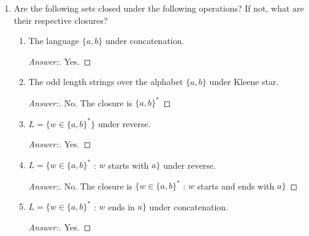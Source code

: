 \documentclass[10pt]{article}
\begin{document}
\begin{enumerate}
\begin{enumerate}
\item
$L = \{w \in \{a, b\}^*$ : $\exists x \in \{a, b\}^+ (w = axa)\}$.
\begin{proof}[Answer:]
\end{proof}
\end{enumerate}


\item
Are the following sets closed under the following operations?  If not, what are their respective closures?
\begin{enumerate}

\item
The language $\{a, b\}$ under concatenation.
\begin{proof}[Answer:]
Yes.
\end{proof}

\item
The odd length strings over the alphabet $\{a, b\}$ under Kleene star.
\begin{proof}[Answer:]
No.  The closure is $\{a, b\}^*$
\end{proof}

\item
$L = \{w \in \{a, b\}^*\}$ under reverse.
\begin{proof}[Answer:]
Yes.
\end{proof}

\item
$L = \{w \in \{a, b\}^*$ : $w$ starts with $a\}$ under reverse.
\begin{proof}[Answer:]
No.  The closure is $\{w \in \{a, b\}^*$ : $w$ starts and ends with $a\}$
\end{proof}

\item
$L = \{w \in \{a, b\}^*$ : $w$ ends in $a\}$ under concatenation.
\begin{proof}[Answer:]
Yes.
\end{proof}
\end{enumerate}
\end{enumerate}
 
\end{document}
